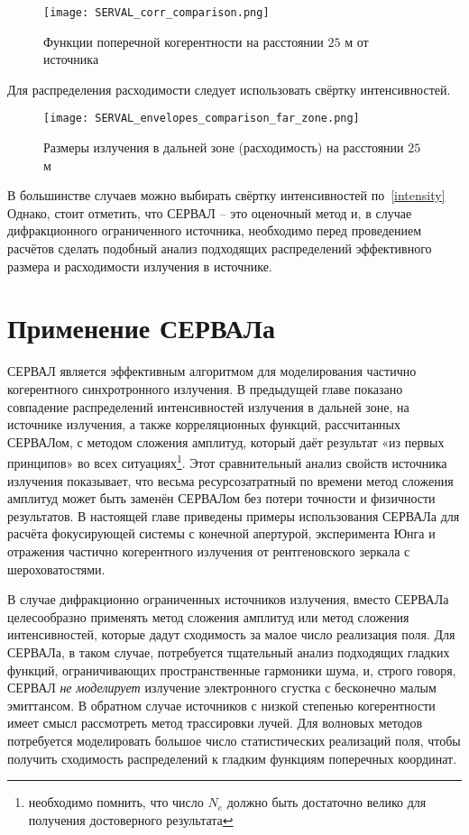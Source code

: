 \begin{figure}[H] 
	\centering 	\texttt{[image: SERVAL\_corr\_comparison.png]}
	\caption{Функции поперечной когерентности на расстоянии $25$ м от источника}
	\label{fig:SERVAL_corr_comparison}
\end{figure}
\noindent Для распределения расходимости следует использовать свёртку интенсивностей.
\begin{figure}[H] 
	\centering 	\texttt{[image: SERVAL\_envelopes\_comparison\_far\_zone.png]}
	\caption{Размеры излучения в дальней зоне (расходимость) на расстоянии $25$ м}
	\label{fig:SERVAL_envelopes_comparison_far_zone}
\end{figure}
В большинстве случаев можно выбирать свёртку интенсивностей по~\ref{intensity} Однако, стоит отметить, что СЕРВАЛ -- это оценочный метод и, в случае дифракционного ограниченного источника, необходимо перед проведением расчётов сделать подобный анализ подходящих распределений эффективного размера и расходимости излучения в источнике.

\chapter{Применение СЕРВАЛа} \label{chapt3}
СЕРВАЛ является эффективным алгоритмом для моделирования частично когерентного синхротронного излучения. В предыдущей главе показано совпадение распределений интенсивностей излучения в дальней зоне, на источнике излучения, а также корреляционных функций, рассчитанных СЕРВАЛом, с методом сложения амплитуд, который даёт результат «из первых принципов» во всех ситуациях\footnote{необходимо помнить, что число $N_e$ должно быть достаточно велико для получения достоверного результата}. Этот сравнительный анализ свойств источника излучения показывает, что весьма ресурсозатратный по времени метод сложения амплитуд может быть заменён СЕРВАЛом без потери точности и физичности результатов. В настоящей главе приведены примеры использования СЕРВАЛа для расчёта фокусирующей системы с конечной апертурой, эксперимента Юнга и отражения частично когерентного излучения от рентгеновского зеркала с шероховатостями. 

В случае дифракционно ограниченных источников излучения, вместо СЕРВАЛа целесообразно применять метод сложения амплитуд или метод сложения интенсивностей, которые дадут сходимость за малое число реализация поля. Для СЕРВАЛа, в таком случае, потребуется тщательный анализ подходящих гладких функций, ограничивающих пространственные гармоники шума, и, строго говоря, СЕРВАЛ \textit{не моделирует} излучение электронного сгустка с бесконечно малым эмиттансом. В обратном случае источников с низкой степенью когерентности имеет смысл рассмотреть метод трассировки лучей. Для волновых методов потребуется моделировать большое число статистических реализаций поля, чтобы получить сходимость распределений к гладким функциям поперечных координат. 

